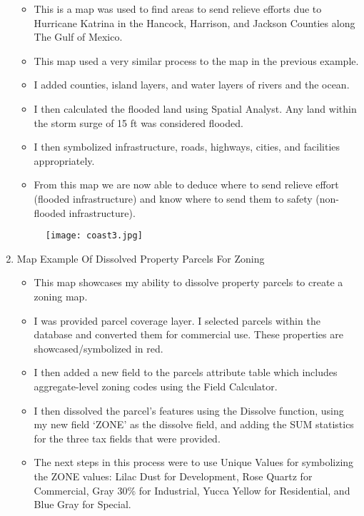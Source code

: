 \documentclass{article}
\begin{document}
\begin{enumerate}
	\begin{itemize}
	\item This is a map was used to find areas to send relieve efforts due to Hurricane Katrina in the Hancock, Harrison, and Jackson Counties along The Gulf of Mexico.   
	\item This map used a very similar process to the map in the previous example.
	\item I added counties, island layers, and water layers of rivers and the ocean.
	\item I then calculated the flooded land using Spatial Analyst. Any land within the storm surge of 15 ft was considered flooded. 
	\item I then symbolized infrastructure, roads, highways, cities, and facilities appropriately. 
	\item From this map we are now able to deduce where to send relieve effort (flooded infrastructure) and know where to send them to safety (non-flooded infrastructure). 



		
	\end{itemize}		
		
			
			\begin{figure}[H]
				\centering
				\texttt{[image: coast3.jpg]}
				\caption{}
				\label{fig:method}
				\end{figure}
	
\newpage		


\item Map Example Of Dissolved Property Parcels For Zoning
	\begin{itemize}
	\item This map showcases my ability to dissolve property parcels to create a zoning map.
	\item I was provided parcel coverage layer. I selected parcels within the database and converted them for commercial use. These properties are showcased/symbolized in red.
	\item I then added a new field to the parcels attribute table which includes aggregate-level zoning codes using the Field Calculator.
	\item I then dissolved the parcel's features using the Dissolve function, using my new field `ZONE' as the dissolve field, and adding the SUM statistics for the three tax fields that were provided. 
	\item The next steps in this process were to use Unique Values for symbolizing the ZONE values: Lilac Dust for Development, Rose Quartz for Commercial, Gray 30\% for Industrial, Yucca Yellow for Residential, and Blue Gray for Special.		
	\end{itemize}		
		

\end{enumerate}
\end{document}
